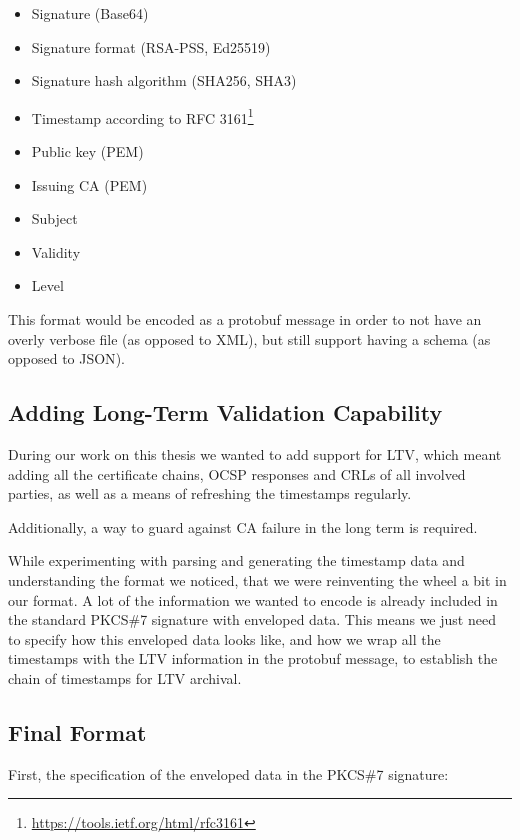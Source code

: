 \begin{itemize}
    \item Signature (Base64)
    \item Signature format (\gls{RSA-PSS}, \gls{Ed25519})
    \item Signature hash algorithm (\gls{SHA}256, \gls{SHA}3)
    \item Timestamp according to \gls{RFC} 3161\footnote{\url{https://tools.ietf.org/html/rfc3161}}
    \item Public key (\gls{PEM})
    \item Issuing \gls{CA} (\gls{PEM})
    \item Subject
    \item Validity
    \item Level
\end{itemize}

This format would be encoded as a protobuf message in order to not have an overly verbose file (as opposed to \gls{XML}),
but still support having a schema (as opposed to \gls{JSON}).

\subsection{Adding Long-Term Validation Capability}\label{subsec:adding-long-term-validation-capability}
During our work on this thesis we wanted to add support for \gls{LTV},
which meant adding all the certificate chains,
\gls{OCSP} responses and \gls{CRL}s of all involved parties,
as well as a means of refreshing the timestamps regularly.

Additionally, a way to guard against \gls{CA} failure in the long term is required.

While experimenting with parsing and generating the timestamp data and understanding the format we noticed,
that we were reinventing the wheel a bit in our format.
A lot of the information we wanted to encode is already included in the standard \gls{PKCS}\#7 signature with enveloped data.
This means we just need to specify how this enveloped data looks like,
and how we wrap all the timestamps with the \gls{LTV} information in the protobuf message,
to establish the chain of timestamps for \gls{LTV} archival.

\subsection{Final Format}\label{subsec:final-format}

First, the specification of the enveloped data in the \gls{PKCS}\#7 signature:

